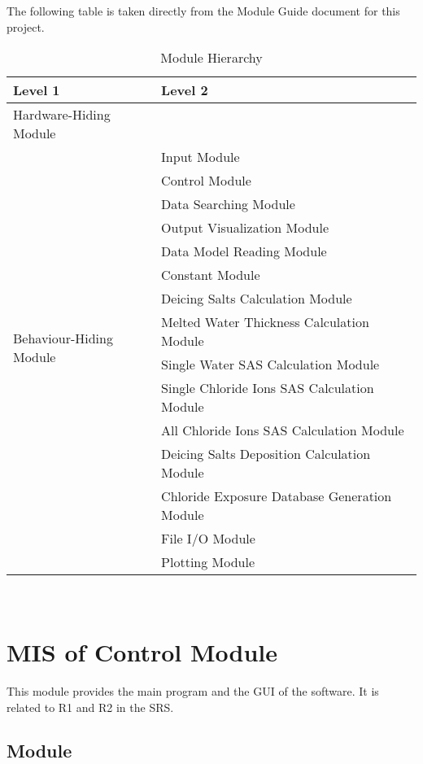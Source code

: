 \documentclass[12pt, titlepage]{article}
\begin{document}
The following table is taken directly from the Module Guide document for this project.
\begin{table}[h!]
\centering
\begin{tabular}{p{} p{}}
\toprule
\textbf{Level 1} & \textbf{Level 2}\\
\midrule

{Hardware-Hiding Module} & ~ \\
\midrule

\multirow{14}{0.3\textwidth}{Behaviour-Hiding Module} & Input Module\\
& Control Module\\
& Data Searching Module\\
& Output Visualization Module\\
& Data Model Reading Module \\
& Constant Module \\
& Deicing Salts Calculation Module \\
& Melted Water Thickness Calculation Module \\
& Single Water SAS Calculation Module \\
& Single Chloride Ions SAS Calculation Module \\
& All Chloride Ions SAS Calculation Module \\
& Deicing Salts Deposition Calculation Module \\
& Chloride Exposure Database Generation Module\\
\midrule

\multirow{2}{0.3\textwidth}{Software Decision Module} &  File I/O Module \\
& Plotting Module \\
\bottomrule

\end{tabular}
\caption{Module Hierarchy}
\label{TblMH}
\end{table}
\newpage
~\newpage

\section{MIS of Control Module} \label{controlModule} 
This module provides the main program and the GUI of the software. It is related to R1 and R2 in the SRS.


\subsection{Module}
\end{document}
